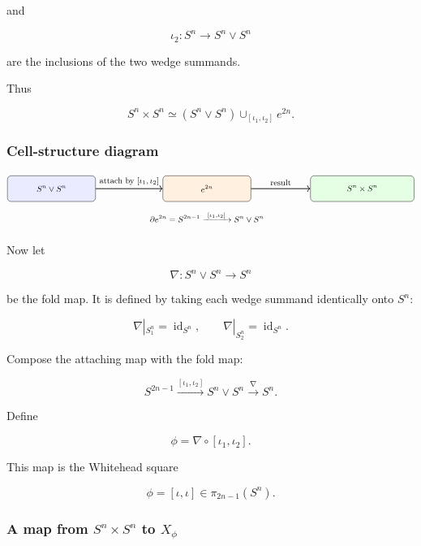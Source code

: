 \documentclass[12pt,a4paper]{article}
\theoremstyle{notespace}
\begin{document}
and

\[
\iota_2:S^n\to S^n\vee S^n
\]

are the inclusions of the two wedge summands.

Thus

\[
S^n\times S^n
\simeq
(S^n\vee S^n)\cup_{[\iota_1,\iota_2]}e^{2n}.
\]

\subsubsection*{Cell-structure diagram}

\[
\begin{tikzpicture}[scale=1.0, every node/.style={font=\small}]
	\node[draw, rounded corners, fill=blue!8, minimum width=3.4cm, minimum height=1cm] (A) at (0,0)
	{\(S^n\vee S^n\)};
	
	\node[draw, rounded corners, fill=orange!12, minimum width=3.4cm, minimum height=1cm] (B) at (6,0)
	{\(e^{2n}\)};
	
	\node[draw, rounded corners, fill=green!10, minimum width=4cm, minimum height=1cm] (C) at (12,0)
	{\(S^n\times S^n\)};
	
	\draw[->, thick] (A) -- node[above] {attach by \([\iota_1,\iota_2]\)} (B);
	\draw[->, thick] (B) -- node[above] {result} (C);
	
	\node at (6,-1.1)
	{\(\partial e^{2n}=S^{2n-1}\xrightarrow{\ [\iota_1,\iota_2]\ }S^n\vee S^n\)};
\end{tikzpicture}
\]

Now let

\[
\nabla:S^n\vee S^n\longrightarrow S^n
\]

be the fold map. It is defined by taking each wedge summand identically onto \(S^n\):

\[
\nabla|_{S^n_1}=\operatorname{id}_{S^n},
\qquad
\nabla|_{S^n_2}=\operatorname{id}_{S^n}.
\]

Compose the attaching map with the fold map:

\[
S^{2n-1}
\xrightarrow{[\iota_1,\iota_2]}
S^n\vee S^n
\xrightarrow{\nabla}
S^n.
\]

Define

\[
\phi=\nabla\circ[\iota_1,\iota_2].
\]

This map is the Whitehead square

\[
\phi=[\iota,\iota]\in \pi_{2n-1}(S^n).
\]

\subsubsection*{A map from \(S^n\times S^n\) to \(X_\phi\)}
\end{document}
